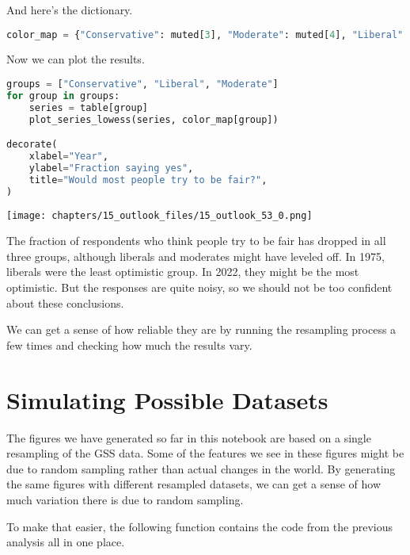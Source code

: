 And here's the dictionary.

\begin{lstlisting}[language=Python,style=source]
color_map = {"Conservative": muted[3], "Moderate": muted[4], "Liberal": muted[0]}
\end{lstlisting}

Now we can plot the results.

\begin{lstlisting}[language=Python,style=source]
groups = ["Conservative", "Liberal", "Moderate"]
for group in groups:
    series = table[group]
    plot_series_lowess(series, color_map[group])

decorate(
    xlabel="Year",
    ylabel="Fraction saying yes",
    title="Would most people try to be fair?",
)
\end{lstlisting}

\begin{center}
\texttt{[image: chapters/15\_outlook\_files/15\_outlook\_53\_0.png]}
\end{center}

The fraction of respondents who think people try to be fair has dropped
in all three groups, although liberals and moderates might have leveled
off. In 1975, liberals were the least optimistic group. In 2022, they
might be the most optimistic. But the responses are quite noisy, so we
should not be too confident about these conclusions.

We can get a sense of how reliable they are by running the resampling
process a few times and checking how much the results vary.

\hypertarget{simulating-possible-datasets}{%
\section{Simulating Possible
Datasets}\label{simulating-possible-datasets}}

The figures we have generated so far in this notebook are based on a
single resampling of the GSS data. Some of the features we see in these
figures might be due to random sampling rather than actual changes in
the world. By generating the same figures with different resampled
datasets, we can get a sense of how much variation there is due to
random sampling.

To make that easier, the following function contains the code from the
previous analysis all in one place.

